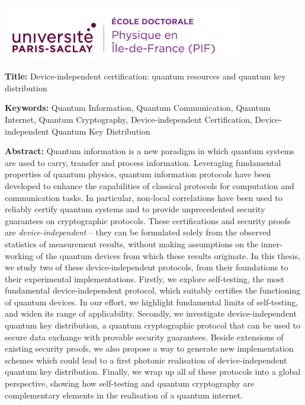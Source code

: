 \documentclass[french,12pt,a4paper]{book}
\begin{document}
\lhead{}
\rhead{}
\rfoot{}
\cfoot{}
\lfoot{}

\noindent 
\includegraphics[height=2.45cm]{Logo/logo_usp_PIF.png}
\vspace{.5cm}
\selectfont

\small

\begin{mdframed}[linecolor=Prune,linewidth=1]
	
	\textbf{Title:} Device-independent certification: quantum resources and quantum key distribution
	
	
	\noindent \textbf{Keywords:} Quantum Information, Quantum Communication, Quantum Internet, Quantum Cryptography, Device-independent Certification, Device-independent Quantum Key Distribution 
	
	\vspace{-.5cm}
	\begin{multicols}{2}
		\noindent \textbf{Abstract:} 
		Quantum information is a new paradigm in which quantum systems are used to carry, transfer and process information.
		Leveraging fundamental properties of quantum physics, quantum information protocols have been developed to enhance the capabilities of classical protocols for computation and communication tasks.
		In particular, non-local correlations have been used to reliably certify quantum systems and to provide unprecedented security guarantees on cryptographic protocols.
		These certifications and security proofs are \textit{device-independent} -- they can be formulated solely from the observed statistics of measurement results, without making assumptions on the inner-working of the quantum devices from which these results originate.
		In this thesis, we study two of these device-independent protocols, from their foundations to their experimental implementations. 
		Firstly, we explore self-testing, the most fundamental device-independent protocol, which suitably certifies the functioning of quantum devices.
		In our effort, we highlight fundamental limits of self-testing, and widen its range of applicability.
		Secondly, we investigate device-independent quantum key distribution, a quantum cryptographic protocol that can be used to secure data exchange with provable security guarantees.
		Beside extensions of existing security proofs, we also propose a way to generate new implementation schemes which could lead to a first photonic realisation of device-independent quantum key distribution.
		Finally, we wrap up all of these protocols into a global perspective, showing how self-testing and quantum cryptography are complementary elements in the realisation of a quantum internet.
	\end{multicols}
\end{mdframed}
\end{document}
